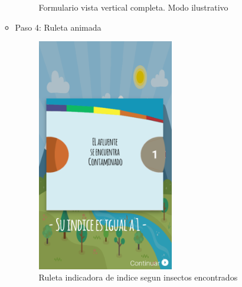 \begin{itemize}
\begin{itemize}
\begin{figure}
											\caption{Formulario vista vertical completa. Modo ilustrativo}
									\label{fig:registroPaso3Completo}
							\end{figure}
						\item Paso 4: Ruleta animada
							\begin{figure}
								\centering
									\includegraphics[width=0.6\textwidth]{Screenshots/ruedita.png}
											\caption{Ruleta indicadora de indice segun insectos encontrados}
									\label{fig:ruedita}
							\end{figure}

					\end{itemize}


\end{itemize}
